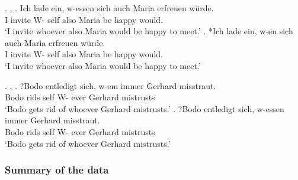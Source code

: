 \ex. , 
\ag. Ich {lade ein}, w-essen sich auch Maria erfreuen würde.\\
 I invite\scsub{[acc]} W- self also Maria {be happy}\scsub{[gen]} would.\\
 `I invite whoever also Maria would be happy to meet.' \hfill \citep[344]{vogel2001}
\bg. *Ich {lade ein}, w-en sich auch Maria erfreuen würde.\\
 I invite\scsub{[acc]} W- self also Maria {be happy}\scsub{[gen]} would.\\
 `I invite whoever also Maria would be happy to meet.' \hfill \citep[344]{vogel2001}

\ex. , 
\ag. ?Bodo entledigt sich, w-em immer Gerhard misstraut.\\
 Bodo rids\scsub{[gen]} self W- ever Gerhard mistrusts\scsub{[dat]}\\
 `Bodo gets rid of whoever Gerhard mistrusts.' \hfill \citep[345]{vogel2001}
\bg. ?Bodo entledigt sich, w-essen immer Gerhard misstraut.\\
 Bodo rids\scsub{[gen]} self W- ever Gerhard mistrusts\scsub{[dat]}\\
 `Bodo gets rid of whoever Gerhard mistrusts.' \hfill \citep[345]{vogel2001}



\subsubsection{Summary of the data}

